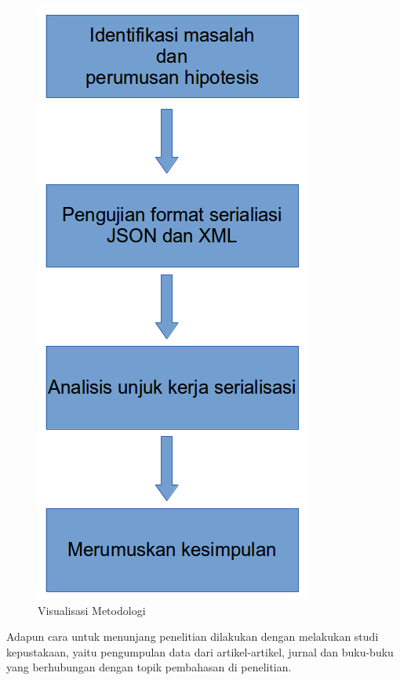 \documentclass[a4paper, 12pt, oneside]{report}
\begin{document}
\onehalfspacing
\begin{figure}[htp]
\centering
\includegraphics[scale=0.45]{images/visualisasi-metodologi.png}
\caption{Visualisasi Metodologi}
\label{visualisasi-metodologi}
\end{figure}

\onehalfspacing Adapun cara untuk menunjang penelitian dilakukan dengan melakukan studi kepustakaan, yaitu pengumpulan data dari artikel-artikel, jurnal dan buku-buku yang berhubungan dengan topik pembahasan di penelitian.

\end{document}
